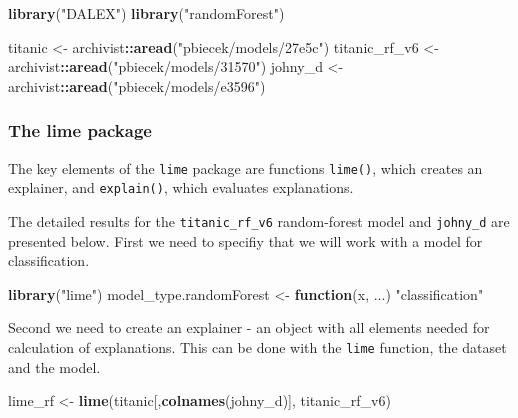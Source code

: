 \documentclass[12pt,]{krantz}
\newenvironment{Shaded}{\begin{snugshade}}{\end{snugshade}}
\newcommand{\ControlFlowTok}[1]{\textcolor[rgb]{0.13,0.29,0.53}{\textbf{#1}}}
\newcommand{\KeywordTok}[1]{\textcolor[rgb]{0.13,0.29,0.53}{\textbf{#1}}}
\newcommand{\NormalTok}[1]{#1}
\newcommand{\OperatorTok}[1]{\textcolor[rgb]{0.81,0.36,0.00}{\textbf{#1}}}
\newcommand{\StringTok}[1]{\textcolor[rgb]{0.31,0.60,0.02}{#1}}
\begin{document}
\begin{Shaded}
\begin{Highlighting}[]
\KeywordTok{library}\NormalTok{(}\StringTok{"DALEX"}\NormalTok{)}
\KeywordTok{library}\NormalTok{(}\StringTok{"randomForest"}\NormalTok{)}

\NormalTok{titanic <-}\StringTok{ }\NormalTok{archivist}\OperatorTok{::}\KeywordTok{aread}\NormalTok{(}\StringTok{"pbiecek/models/27e5c"}\NormalTok{)}
\NormalTok{titanic_rf_v6 <-}\StringTok{ }\NormalTok{archivist}\OperatorTok{::}\KeywordTok{aread}\NormalTok{(}\StringTok{"pbiecek/models/31570"}\NormalTok{)}
\NormalTok{johny_d <-}\StringTok{ }\NormalTok{archivist}\OperatorTok{::}\KeywordTok{aread}\NormalTok{(}\StringTok{"pbiecek/models/e3596"}\NormalTok{)}
\end{Highlighting}
\end{Shaded}

\hypertarget{the-lime-package}{%
\subsubsection{The lime package}\label{the-lime-package}}

The key elements of the \texttt{lime} package are functions \texttt{lime()}, which creates an explainer, and \texttt{explain()}, which evaluates explanations.

The detailed results for the \texttt{titanic\_rf\_v6} random-forest model and \texttt{johny\_d} are presented below. First we need to specifiy that we will work with a model for classification.

\begin{Shaded}
\begin{Highlighting}[]
\KeywordTok{library}\NormalTok{(}\StringTok{"lime"}\NormalTok{)}
\NormalTok{model_type.randomForest <-}\StringTok{ }\ControlFlowTok{function}\NormalTok{(x, ...) }\StringTok{"classification"}
\end{Highlighting}
\end{Shaded}

Second we need to create an explainer - an object with all elements needed for calculation of explanations. This can be done with the \texttt{lime} function, the dataset and the model.

\begin{Shaded}
\begin{Highlighting}[]
\NormalTok{lime_rf <-}\StringTok{ }\KeywordTok{lime}\NormalTok{(titanic[,}\KeywordTok{colnames}\NormalTok{(johny_d)], titanic_rf_v6)}
\end{Highlighting}
\end{Shaded}
\end{document}
